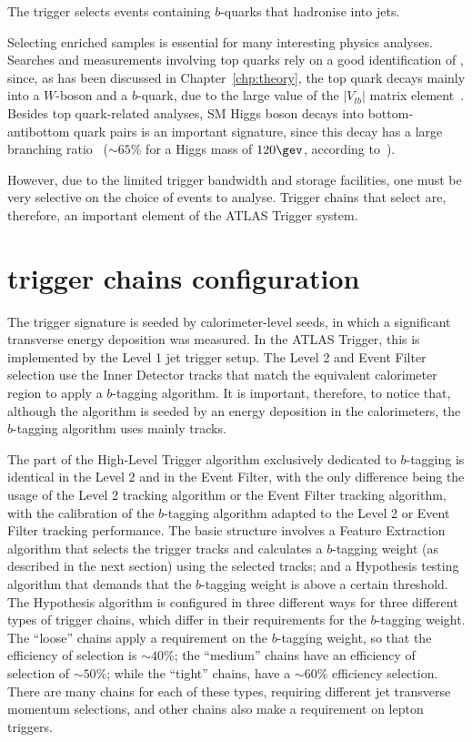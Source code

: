 
The \bjet trigger selects events
containing $b$-quarks that hadronise into jets.

Selecting \bjet enriched samples is essential for many interesting physics analyses. Searches and measurements
involving
top quarks rely on a good identification of \bjets, since, as has been discussed in Chapter~\ref{chp:theory}, the top quark decays mainly into a
$W$-boson and a $b$-quark, due to the large value of the $|V_{tb}|$ matrix element~\cite{pdg2012}.
Besides top quark-related analyses, SM Higgs boson decays into bottom-antibottom quark pairs is an important signature, since this decay has a large branching
ratio~\cite{higgs_br} ($\sim 65\%$ for a Higgs mass of $120 \gev$, according to~\cite{higgs_br}).

However, due to the limited trigger bandwidth and storage facilities, one must be very selective on the choice of events to analyse. Trigger chains that select
\bjets are, therefore, an important element of the ATLAS Trigger system.

\section{\bjet trigger chains configuration}

The \bjet trigger signature is seeded by calorimeter-level seeds, in which a significant transverse energy deposition was measured. In the ATLAS Trigger, this
is implemented by the Level 1 jet trigger setup.
The Level 2 and Event Filter \bjet selection use the Inner Detector tracks that match the equivalent calorimeter region to apply a $b$-tagging
algorithm. It is important, therefore, to notice that, although the algorithm is seeded by an energy deposition in the calorimeters,
the $b$-tagging algorithm uses mainly tracks.

The part of the \bjet High-Level Trigger algorithm exclusively dedicated to $b$-tagging
is identical in the Level 2 and in the Event Filter, with the only difference being the usage of the Level 2 tracking algorithm or the Event Filter tracking algorithm,
with the calibration of the $b$-tagging algorithm adapted to the Level 2 or Event Filter tracking performance.
The basic structure involves a Feature Extraction algorithm that selects the trigger tracks and calculates a $b$-tagging weight (as described in the next section)
using the selected tracks; and
a Hypothesis testing algorithm that demands that the $b$-tagging weight is above a certain threshold. The Hypothesis algorithm is configured in three different ways for
three different types of trigger chains, which differ in their requirements for the $b$-tagging weight. The ``loose'' chains apply a requirement on
the $b$-tagging weight, so that the efficiency of \bjet selection is $\sim 40\%$; the ``medium'' chains have an efficiency of \bjet selection of $\sim 50\%$; while the
``tight'' chains, have a $\sim 60\%$ efficiency selection. There are many chains for each of these types, requiring different jet transverse momentum selections, and other
chains also make a requirement on lepton triggers.

